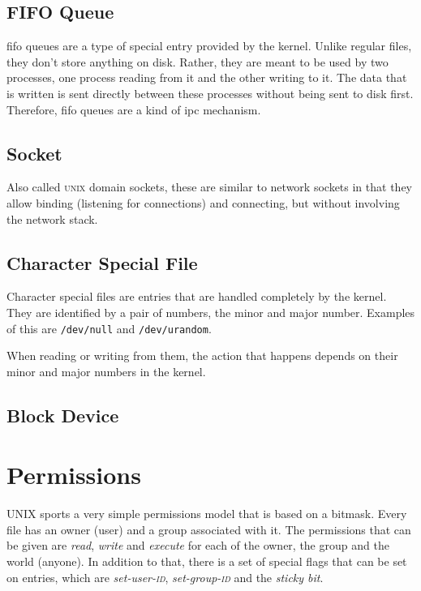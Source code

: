 \documentclass[a4paper]{article}
\begin{document}
\subsection{FIFO Queue}

\gls{fifo} queues are a type of special entry provided by the kernel. Unlike regular files, they don't store anything on disk. Rather, they are meant to be used by two processes, one process reading from it and the other writing to it. The data that is written is sent directly between these processes without being sent to disk first. Therefore, \gls{fifo} queues are a kind of \gls{ipc} mechanism.

\subsection{Socket}

Also called \textsc{unix} domain sockets, these are similar to network sockets in that they allow binding (listening for connections) and connecting, but without involving the network stack.

\subsection{Character Special File}

Character special files are entries that are handled completely by the kernel. They are identified by a pair of numbers, the minor and major number. Examples of this are \verb|/dev/null| and \verb|/dev/urandom|.

When reading or writing from them, the action that happens depends on their minor and major numbers in the kernel.

\subsection{Block Device}

\section{Permissions}

UNIX sports a very simple permissions model that is based on a bitmask. Every file has an owner (user) and a group associated with it. The permissions that can be given are \emph{read}, \emph{write} and \emph{execute} for each of the owner, the group and the world (anyone). In addition to that, there is a set of special flags that can be set on entries, which are \emph{set-user-\textsc{id}}, \emph{set-group-\textsc{id}} and the \emph{sticky bit}.
\end{document}
